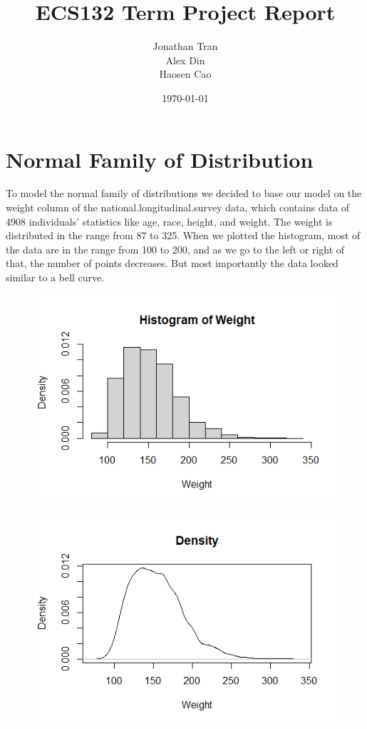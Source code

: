 \documentclass[12pt, a4paper, oneside]{report}
\title{ECS132 Term Project Report}
\author{Jonathan Tran\\Alex Din\\Haosen Cao}
\date{\today}
\begin{document}
\maketitle
\tableofcontents
\newpage









\section*{Normal Family of Distribution}
To model the normal family of distributions we decided to base our model on the weight column of the national.longitudinal.survey data, which contains data of 4908 individuals' statistics like age, race, height, and weight. The weight is distributed in the range from 87 to 325. When we plotted the histogram, most of the data are in the range from 100 to 200, and as we go to the left or right of that, the number of points decreases. But most importantly the data looked similar to a bell curve.

\begin{figure}[h]
  \centering
  \includegraphics[width=0.7\linewidth]{normHist.png}
\end{figure}

\begin{figure}[h]
  \centering
  \includegraphics[width=0.7\linewidth]{normDensity.png}
\end{figure}
\end{document}
